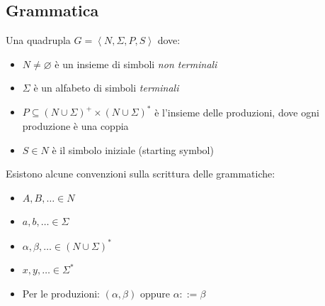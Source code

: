 \documentclass{article}
\begin{document}
\subsection*{Grammatica}
Una quadrupla \( G = \left\langle N, \Sigma, P, S \right\rangle\) dove:
\begin{itemize}
  \item \( N \neq \varnothing \) è un insieme di simboli \emph{non terminali}
  \item \( \Sigma \) è un alfabeto di simboli \emph{terminali}
  \item \( P \subseteq (N \cup \Sigma)^+ \times (N \cup \Sigma)^* \) è l'insieme delle produzioni, dove ogni produzione è una coppia
  \item \( S \in N \) è il simbolo iniziale (starting symbol)
\end{itemize}
Esistono alcune convenzioni sulla scrittura delle grammatiche:
\begin{itemize}
  \item \(A, B, \ldots \in N\)
  \item \(a, b, \ldots \in \Sigma\)
  \item \(\alpha, \beta, \ldots \in (N \cup \Sigma)^*\)
  \item \(x, y, \ldots \in \Sigma^*\)
  \item Per le produzioni: \((\alpha, \beta) \text{ oppure } \alpha ::= \beta\)
\end{itemize}
\end{document}
